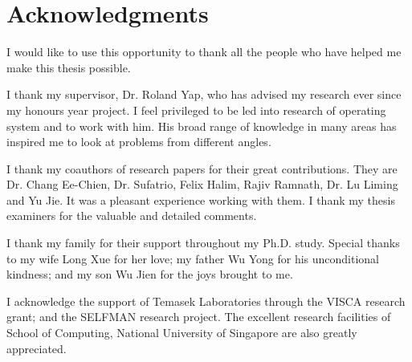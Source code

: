 \chapter{Acknowledgments}

I would like to use this opportunity to thank all the people who have
helped me make this thesis possible.

I thank my supervisor, Dr. Roland Yap, who has advised my research ever
since my honours year project.
I feel privileged to be led into research of operating system and to work
with him.
His broad range of knowledge in many areas has inspired me to look at
problems from different angles.

I thank my coauthors of research papers for their great contributions.
They are Dr. Chang Ee-Chien, Dr. Sufatrio, Felix Halim, Rajiv Ramnath,
Dr. Lu Liming and Yu Jie.
It was a pleasant experience working with them.
I thank my thesis examiners for the valuable and detailed comments.

I thank my family for their support throughout my Ph.D. study.
Special thanks to my wife Long Xue for her love;
my father Wu Yong for his unconditional kindness;
and my son Wu Jien for the joys brought to me.

I acknowledge the support of Temasek Laboratories through the
VISCA research grant; and the SELFMAN research project.
The excellent research facilities of School of Computing, National
University of Singapore are also greatly appreciated.
